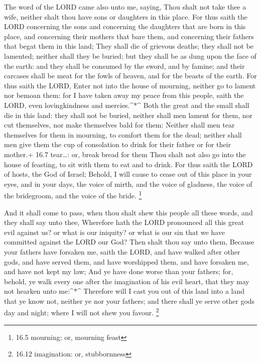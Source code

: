  The word of the LORD came also unto me, saying,
 Thou shalt not take thee a wife, neither shalt thou have
sons or daughters in this place.  For thus saith the LORD
concerning the sons and concerning the daughters that are born in this
place, and concerning their mothers that bare them, and concerning their
fathers that begat them in this land;  They shall die of
grievous deaths; they shall not be lamented; neither shall they be
buried; but they shall be as dung upon the face of the earth: and they
shall be consumed by the sword, and by famine; and their carcases shall
be meat for the fowls of heaven, and for the beasts of the earth.
 For thus saith the LORD, Enter not into the house of
mourning, neither go to lament nor bemoan them: for I have taken away my
peace from this people, saith the LORD, even lovingkindness and
mercies.\^{}*\^{}  Both the great and the small shall die in
this land: they shall not be buried, neither shall men lament for them,
nor cut themselves, nor make themselves bald for them: 
Neither shall men tear themselves for them in mourning, to comfort them
for the dead; neither shall men give them the cup of consolation to
drink for their father or for their mother.+ 16.7 tear\ldots: or, break
bread for them  Thou shalt not also go into the house of
feasting, to sit with them to eat and to drink.  For thus
saith the LORD of hosts, the God of Israel; Behold, I will cause to
cease out of this place in your eyes, and in your days, the voice of
mirth, and the voice of gladness, the voice of the bridegroom, and the
voice of the bride. \footnote{16.5 mourning: or, mourning feast}

 And it shall come to pass, when thou shalt shew this
people all these words, and they shall say unto thee, Wherefore hath the
LORD pronounced all this great evil against us? or what is our iniquity?
or what is our sin that we have committed against the LORD our God?
 Then shalt thou say unto them, Because your fathers have
forsaken me, saith the LORD, and have walked after other gods, and have
served them, and have worshipped them, and have forsaken me, and have
not kept my law;  And ye have done worse than your fathers;
for, behold, ye walk every one after the imagination of his evil heart,
that they may not hearken unto me:\^{}*\^{}  Therefore will
I cast you out of this land into a land that ye know not, neither ye nor
your fathers; and there shall ye serve other gods day and night; where I
will not shew you favour. \footnote{16.12 imagination: or, stubbornness}

